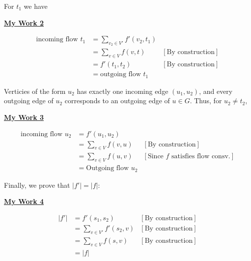 \documentclass[12pt]{article}
\begin{document}
\begin{enumerate}[1.]
\begin{enumerate}[a)]
        \bigskip

        For $t_1$ we have

        \begin{mdframed}
        \underline{\textbf{My Work 2}}

        \begin{align}
        \text{incoming flow $t_1$} &= \sum\limits_{v_2 \in V'} f'(v_2, t_1)\\
        &= \sum\limits_{v \in V} f(v, t) & [\text{By construction}]\\
        &= f'(t_1, t_2) & [\text{By construction}]\\
        &= \text{outgoing flow $t_1$}
        \end{align}

        \end{mdframed}

        \bigskip

        Verticies of the form $u_2$ has exactly one incoming edge $(u_1, u_2)$, and
        every outgoing edge of $u_2$ corresponds to an outgoing edge of $u \in G$. Thus,
        for $u_2 \neq t_2$,

        \begin{mdframed}
        \underline{\textbf{My Work 3}}

        \begin{align}
        \text{incoming flow $u_2$} &= f'(u_1, u_2)\\
        &= \sum\limits_{v \in V} f(v,u) & [\text{By construction}]\\
        &= \sum\limits_{v \in V} f(u,v) & [\text{Since $f$ satisfies flow consv.}]\\
        &= \text{Outgoing flow $u_2$}
        \end{align}

        \end{mdframed}

        \bigskip

        Finally, we prove that $\lvert f' \rvert = \lvert f \rvert$:

        \bigskip

        \begin{mdframed}
        \underline{\textbf{My Work 4}}

        \begin{align}
        \lvert f' \rvert &= f'(s_1, s_2) & [\text{By construction}]\\
        &= \sum\limits_{v \in V'} f'(s_2,v) & [\text{By construction}]\\
        &= \sum\limits_{v \in V} f(s,v) & [\text{By construction}]\\
        &= \lvert f \rvert
        \end{align}



\end{mdframed}
\end{enumerate}
\end{enumerate}
\end{document}

